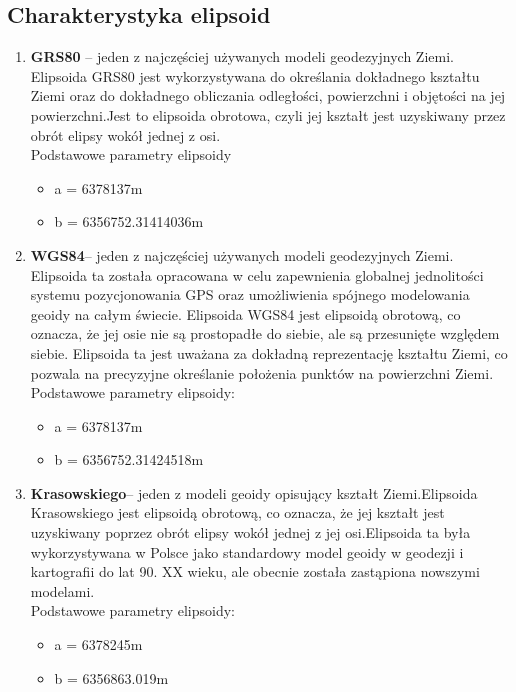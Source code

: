 \documentclass[a4paper,titleauthor]{mwart}
\begin{document}
    \subsection{Charakterystyka elipsoid}
    \begin{enumerate}
        \item \textbf{GRS80} -- jeden z najczęściej używanych modeli geodezyjnych Ziemi. Elipsoida GRS80 jest wykorzystywana do określania dokładnego kształtu Ziemi oraz do dokładnego obliczania odległości, powierzchni i objętości na jej powierzchni.Jest to elipsoida obrotowa, czyli jej kształt jest uzyskiwany przez obrót elipsy wokół jednej z osi.\\
        Podstawowe parametry elipsoidy
        \begin{itemize}
            \item a = 6378137m
            \item b = 6356752.31414036m
        \end{itemize}
        \begin{flushright}
            \cite{GRS80}
        \end{flushright}
        \item \textbf{WGS84}-- jeden z najczęściej używanych modeli geodezyjnych Ziemi. Elipsoida ta została opracowana w celu zapewnienia globalnej jednolitości systemu pozycjonowania GPS oraz umożliwienia spójnego modelowania geoidy na całym świecie. Elipsoida WGS84 jest elipsoidą obrotową, co oznacza, że jej osie nie są prostopadłe do siebie, ale są przesunięte względem siebie. Elipsoida ta jest uważana za dokładną reprezentację kształtu Ziemi, co pozwala na precyzyjne określanie położenia punktów na powierzchni Ziemi.\\
        Podstawowe parametry elipsoidy:
        \begin{itemize}
            \item a = 6378137m
            \item b = 6356752.31424518m
        \end{itemize}
        \begin{flushright}
            \cite{WGS84}
        \end{flushright}
        \item \textbf{Krasowskiego}-- jeden z modeli geoidy opisujący kształt Ziemi.Elipsoida Krasowskiego jest elipsoidą obrotową, co oznacza, że jej kształt jest uzyskiwany poprzez obrót elipsy wokół jednej z jej osi.Elipsoida ta była wykorzystywana w Polsce jako standardowy model geoidy w geodezji i kartografii do lat 90. XX wieku, ale obecnie została zastąpiona nowszymi modelami.\\
        Podstawowe parametry elipsoidy:
        \begin{itemize}
            \item a = 6378245m
            \item b = 6356863.019m
        \end{itemize}
        \begin{flushright}
            \cite{Krasowski}
        \end{flushright}
    \end{enumerate}
\end{document}
